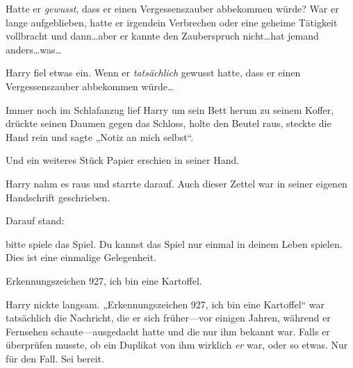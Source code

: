 Hatte er \emph{gewusst}, dass er einen Vergessenszauber abbekommen würde? War er lange aufgeblieben, hatte er irgendein Verbrechen oder eine geheime Tätigkeit vollbracht und dann…aber er kannte den Zauberspruch nicht…hat jemand anders…was…

Harry fiel etwas ein. Wenn er \emph{tatsächlich} gewusst hatte, dass er einen Vergessenszauber abbekommen würde…

Immer noch im Schlafanzug lief Harry um sein Bett herum zu seinem Koffer, drückte seinen Daumen gegen das Schloss, holte den Beutel raus, steckte die Hand rein und sagte „Notiz an mich selbst“.

Und ein weiteres Stück Papier erschien in seiner Hand.

Harry nahm es raus und starrte darauf. Auch dieser Zettel war in seiner eigenen Handschrift geschrieben.

Darauf stand:

\begin{writtenNote}

bitte spiele das Spiel. Du kannst das Spiel nur einmal in deinem Leben spielen. Dies ist eine einmalige Gelegenheit.

Erkennungszeichen 927, ich bin eine Kartoffel.

\end{writtenNote}

Harry nickte langsam. „Erkennungszeichen 927, ich bin eine Kartoffel“ war tatsächlich die Nachricht, die er sich früher—vor einigen Jahren, während er Fernsehen schaute—ausgedacht hatte und die nur ihm bekannt war. Falls er überprüfen musste, ob ein Duplikat von ihm wirklich \emph{er} war, oder so etwas. Nur für den Fall. Sei bereit.

